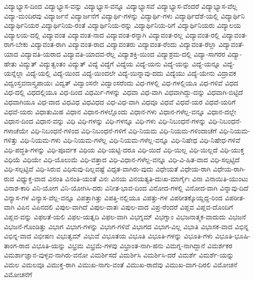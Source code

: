 {ವಿದ್ಯಾಭ್ಯಾಸ-ದಿಂದ
ವಿದ್ಯಾಭ್ಯಾಸ-ವನ್ನು
ವಿದ್ಯಾಭ್ಯಾಸ-ವನ್ನೂ
ವಿದ್ಯಾಭ್ಯಾಸವೆ
ವಿದ್ಯಾಭ್ಯಾಸ-ವೆಂದರೆ
ವಿದ್ಯಾಭ್ಯಾಸ-ವೆಲ್ಲ
ವಿದ್ಯಾ-ಮಂದಿರವು
ವಿದ್ಯಾರ್ಜನೆ
ವಿದ್ಯಾರ್ಜನೆಗೆ
ವಿದ್ಯಾರ್ಥಿ-ಗಳನ್ನು
ವಿದ್ಯಾರ್ಥಿ-ಗಳು
ವಿದ್ಯಾರ್ಥಿದೆಶೆ-ಯಲ್ಲಿ
ವಿದ್ಯಾರ್ಥಿನಿ
ವಿದ್ಯಾರ್ಥಿನಿಯರ
ವಿದ್ಯಾರ್ಥಿನಿಯ-ರಂತೆ
ವಿದ್ಯಾರ್ಥಿನಿಯ-ರನ್ನು
ವಿದ್ಯಾರ್ಥಿನಿಯ-ರಿಗೆ
ವಿದ್ಯಾರ್ಥಿನಿಯರು
ವಿದ್ಯಾಲಯ
ವಿದ್ಯಾಲಯ-ದಲ್ಲಿ
ವಿದ್ಯಾವಂತ
ವಿದ್ಯಾವಂತ-ನಾದ
ವಿದ್ಯಾವಂತ-ರನ್ನಾಗಿ
ವಿದ್ಯಾವಂತ-ರಲ್ಲ
ವಿದ್ಯಾವಂತ-ರಲ್ಲಿ
ವಿದ್ಯಾವಂತ-ರಾಗ-ಬೇಕು
ವಿದ್ಯಾವಂತ-ರಾಗಿ
ವಿದ್ಯಾವಂತ-ರಾದ
ವಿದ್ಯಾವಂತರು
ವಿದ್ಯಾವಂತ-ರೆಂದು
ವಿದ್ಯಾವಂತ-ರೆಲ್ಲಾ
ವಿದ್ಯಾವಂತೆ-ಯಾದ
ವಿದ್ಯಾವತಿ-ಯರಾದ
ವಿದ್ಯಾವತಿ-ಯಾದವ-ರೆಲ್ಲ
ವಿದ್ಯಾಶಕ್ತಿ-ಯಿಂದ
ವಿದ್ಯಾಶ್ರಮ-ದಲ್ಲಿ
ವಿದ್ಯಾ-ಸಾಗರರ
ವಿದ್ಯಾ-ಹೇತು
ವಿದ್ಯುತ್
ವಿದ್ಯುತ್ವಂತಂ
ವಿದ್ಯುತ್
ವಿದ್ಯೆ
ವಿದ್ಯೆಗೆ
ವಿದ್ಯೆಯ
ವಿದ್ಯೆ-ಯನು
ವಿದ್ಯೆ-ಯನ್ನು
ವಿದ್ಯೆ-ಯನ್ನೂ
ವಿದ್ಯೆ-ಯನ್ನೆಲ್ಲಾ
ವಿದ್ಯೆ-ಯಲ್ಲಿ
ವಿದ್ಯೆ-ಯಿಂದ
ವಿದ್ಯೆ-ಯಿಂದಲೇ
ವಿದ್ಯೆ-ಯಿನ್ನಾವು-ದದು
ವಿದ್ಯೆಯು
ವಿದ್ಯೆ-ಯೇನು
ವಿದ್ರಾವಕ
ವಿದ್ವಂಸ್ತವನಾಸ್ತ್ಯಪಾಯಃ
ವಿದ್ವತ್
ವಿದ್ವಾಂಸನೇ
ವಿದ್ವಾಂಸರೆಂದು
ವಿಧ-ಗಳಲ್ಲಿ
ವಿಧ-ಗಳಲ್ಲಿಯೂ
ವಿಧ-ಗಳಿವೆ
ವಿಧದ
ವಿಧ-ದಲ್ಲಿ
ವಿಧದಲ್ಲಿಯೂ
ವಿಧ-ದಿಂದ
ವಿಧರ್ಮಿ-ಗಳನ್ನು
ವಿಧವಾ
ವಿಧ-ವಾಗಿ
ವಿಧವಾಗಿದ್ದು-ದನ್ನು
ವಿಧವಾಗಿ-ಬಿಟ್ಟಿದೆ
ವಿಧವಾಗಿಯೂ
ವಿಧ-ವಾದ
ವಿಧವಿಧ
ವಿಧವಿಧದ
ವಿಧ-ವಿಧ-ವಾಗಿ
ವಿಧವೂ
ವಿಧವೆ
ವಿಧವೆ-ಯರ
ವಿಧವೆ-ಯರಿಗೆ
ವಿಧವೆ-ಯರು
ವಿಧಾತುಮಿಹ
ವಿಧಾನ
ವಿಧಾನ-ಗಳಲ್ಲೊಂದು
ವಿಧಾನ-ಗಳು
ವಿಧಾನ-ಗಳೆಲ್ಲ-ವನ್ನೂ
ವಿಧಾನ-ದಲ್ಲೇ
ವಿಧಾನ-ದಿಂದ
ವಿಧಾನ-ವನ್ನು
ವಿಧಿ
ವಿಧಿ-ಗಳನ್ನು
ವಿಧಿ-ಗಳನ್ನೂ
ವಿಧಿ-ಗಳು
ವಿಧಿ-ನಿಬಂಧನೆ-ಗಳನ್ನು
ವಿಧಿ-ನಿಬಂಧನೆ-ಗಳಾಚೆಯೇ
ವಿಧಿ-ನಿಬಂಧನೆ-ಗಳಿಂದ
ವಿಧಿ-ನಿಬಂಧನೆ-ಗಳಿಗೆ
ವಿಧಿ-ನಿಯಮ
ವಿಧಿ-ನಿಯಮ-ಗಳಿಂದಾಚೆಗೆ
ವಿಧಿ-ನಿಯಮ-ಗಳಿತ್ತು
ವಿಧಿ-ನಿಯಮ-ಗಳು
ವಿಧಿ-ನಿಯಮ-ಗಳೆಲ್ಲ
ವಿಧಿ-ನಿಯಮ-ಗಳೆಲ್ಲ-ವನ್ನೂ
ವಿಧಿ-ನಿಷೇಧ
ವಿಧಿ-ನಿಷೇಧ-ಗಳಿವೆ
ವಿಧಿ-ಪದ್ಧತಿ-ಗಳನ್ನು
ವಿಧಿ-ಪೂರ್ವಕ
ವಿಧಿಯ
ವಿಧಿ-ಯಟ್ಟಿ-ದರೂ
ವಿಧಿ-ಯಿದೆ
ವಿಧಿ-ಯಿಲ್ಲ
ವಿಧಿ-ಯಿಲ್ಲದೆ
ವಿಧಿ-ಯುಕ್ತ
ವಿಧಿಯೆ
ವಿಧಿಯೇ
ವಿಧಿ-ಯೊಲುಮೆ
ವಿಧಿ-ವತ್ತಾದ
ವಿಧಿ-ವಿಧಾನ-ಗಳೆಲ್ಲ-ವನ್ನೂ
ವಿಧಿ-ವಿ-ಹಿತ-ವಾದ
ವಿಧಿ-ಸಲ್ಪಟ್ಟಿದೆ
ವಿಧಿ-ಸಲ್ಪಟ್ಟಿವೆ
ವಿಧಿ-ಸಿರುವ
ವಿಧಿಸುವು-ದಿಲ್ಲವಷ್ಟೆ
ವಿಧೃತ-ವಾಗಿರು-ವುದು
ವಿಧೇಯತೆ
ವಿಧೇಯ-ರಾಗಿ
ವಿಧೇಯ-ರಾಗಿ-ರುವ
ವಿಧ್ಯುಕ್ತ-ವಾದ
ವಿನಂತಿ
ವಿನಂತಿ-ಯಂತೆ
ವಿನಃ
ವಿನಯ
ವಿನಯತ್ಯತಿ-ದುಃಖ-ಮಾರ್ಗೈಃ
ವಿನಾ
ವಿನಾಯಿತಿ-ಯುಂಟು
ವಿನಾಶ-ಕಾರಿ
ವಿನಿ-ಯೋಗ
ವಿನಿ-ಯೋಗಿಸಿ-ದರು
ವಿನೀತ-ಭಾವ-ದಿಂದ
ವಿನೋದ-ಗಳಲ್ಲಿ
ವಿನೋದ-ವಾಗಿ
ವಿನ್ನಾವು-ದಿದೆ
ವಿನ್ಯಾಸ-ಗಳ
ವಿನ್ಯಾಸ-ವೆಲ್ಲ-ವನ್ನೂ
ವಿಪತ್ತಾಗಿತ್ತು
ವಿಪತ್ತಿ-ನಲ್ಲಿಯೂ
ವಿಪತ್ತು-ಗಳ
ವಿಪರೀತಕ್ಕೊಯ್ದದ್ದ-ರಿಂದ
ವಿಪರೀತ-ವಾಗಿ
ವಿಪಿನ
ವಿಪಿನದಲಿ
ವಿಪುಲ-ವಾಗಿದೆ
ವಿಪುಲ-ವಾತಃ
ವಿಪುಲ-ವಾದ
ವಿಪ್ರ-ರೆಂದರೆ
ವಿಪ್ಲವ
ವಿಪ್ಲವ-ದೊಂದಿಗೆ
ವಿಪ್ಲವ-ವನ್ನು
ವಿಫಲತೆ-ಯಲಿ
ವಿಫಲ-ಯತ್ನದಿ
ವಿಫಲ-ವಾಗಿ
ವಿಭಗ್ನಮ್
ವಿಭಗ್ನಾಂ
ವಿಭಜನಾತ್ಮಕ-ವಾದುದು
ವಿಭಜನೆ
ವಿಭಜನೆ-ಗೊಂಡಿತ್ತು
ವಿಭಾಗ
ವಿಭಾಗ-ಗಳನ್ನು
ವಿಭಾಗ-ಗಳಿವೆ
ವಿಭಾಗದ
ವಿಭಾಗ-ವಿಲ್ಲ
ವಿಭಾತಿ
ವಿಭಾಸಕ-ವಾದ
ವಿಭಿನ್ನ
ವಿಭಿನ್ನ-ವಾದ
ವಿಭೀಷಣ
ವಿಭುತ್ವಮ್
ವಿಭುವೆ
ವಿಭೂತಯ
ವಿಭೂತಿ
ವಿಭೂತಿ-ಗಳನ್ನು
ವಿಭೂತಿ-ಗಳು
ವಿಭೂತಿ-ಭೂಷಿ-ತಾಂಗ-ರಾದ
ವಿಭೂತಿ-ಯನ್ನು
ವಿಭ್ರಮ
ವಿಭ್ರಮೆ-ಗಳವು
ವಿಭ್ರಾಂತ-ನಾಗಿ-ಹನು
ವಿಮಗ್ನ-ನಾಗಿದ್ದಾನೆ
ವಿಮರ್ಶಕರ
ವಿಮರ್ಶಾಜ್ಞಾನ-ವುಳ್ಳವ-ನಾಗಿರು-ವನೋ
ವಿಮರ್ಶಿಸದೆ
ವಿಮರ್ಶಿಸಿ
ವಿಮರ್ಶಿಸಿ-ದರೆ
ವಿಮರ್ಶೆ
ವಿಮರ್ಶೆ-ಯನ್ನು
ವಿಮಲ
ವಿಮಲವೂ
ವಿಮುಕ್ತ-ರಾಗಿ
ವಿಮುಖ-ನಾಗು-ವಂತೆ
ವಿಮುಖ-ರಾದೆವು
ವಿಮುಖ-ವಾಗ-ದಿರಲಿ
ವಿಮೋಚನೆ
ವಿಮೋಚನೆಗೆ
}
